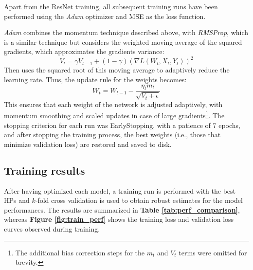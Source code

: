 \noindent
Apart from the ResNet training, all subsequent training runs have been performed using the \textit{Adam} \cite{kingma2014adam} optimizer and MSE as the loss function.

\textit{Adam} combines the momentum technique described above, with \textit{RMSProp}, which is a similar technique but considers the weighted moving average of the squared gradients, which approximates the gradients variance:
    $$
        V_t = \gamma V_{t-1} + (1-\gamma)(\nabla L(W_t, X_t, Y_t))^2  
    $$
Then uses the squared root of this moving average to adaptively reduce the learning rate. Thus, the update rule for the weights becomes:
    $$
        W_t = W_{t-1} - \frac{\eta_t m_t}{\sqrt{V_t + \epsilon}}
    $$
This ensures that each weight of the network is adjusted adaptively, with momentum smoothing and scaled updates in case of large gradients\footnote{The additional bias correction steps for the $m_t$ and $V_t$ terms were omitted for brevity.}. The stopping criterion for each run was EarlyStopping, with a patience of 7 epochs, and after stopping the training process, the best weights (i.e., those that minimize validation loss) are restored and saved to disk.

\subsection{Training results}
\noindent
After having optimized each model, a training run is performed with the best HPs and $k$-fold cross validation is used to obtain robust estimates for the model performances. The results are summarized in \textbf{Table \ref{tab:perf_comparison}}, whereas \textbf{Figure \ref{fig:train_perf}} shows the training loss and validation loss curves observed during training. 


